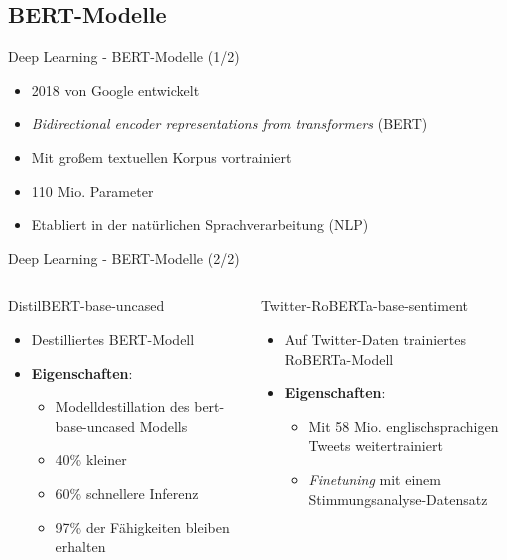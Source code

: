 \documentclass[aspectratio=169]{beamer}
\begin{document}
\subsection{BERT-Modelle}

\begin{frame}{Deep Learning - BERT-Modelle (1/2)}
	\begin{itemize}
		\item 2018 von Google entwickelt
		\item \textit{Bidirectional encoder representations from transformers} (BERT)
		\item Mit großem textuellen Korpus vortrainiert
		\item 110 Mio. Parameter
		\item Etabliert in der natürlichen Sprachverarbeitung (NLP)
	\end{itemize}
\end{frame}

\begin{frame}{Deep Learning - BERT-Modelle (2/2)}
	\begin{columns}[T]
		\begin{block}{DistilBERT-base-uncased}
			\begin{itemize}
				\item Destilliertes BERT-Modell
				\item \textbf{Eigenschaften}:
				      \begin{itemize}
					      \item Modelldestillation des bert-base-uncased Modells
					      \item 40\% kleiner
					      \item 60\% schnellere Inferenz
					      \item 97\% der Fähigkeiten bleiben erhalten
				      \end{itemize}
			\end{itemize}
			\vspace{0.04cm}
		\end{block}
		\begin{block}{Twitter-RoBERTa-base-sentiment}
			\begin{itemize}
				\item Auf Twitter-Daten trainiertes RoBERTa-Modell
				\item \textbf{Eigenschaften}:
				      \begin{itemize}
					      \item Mit 58 Mio. englischsprachigen Tweets weitertrainiert
					      \item \textit{Finetuning} mit einem Stimmungsanalyse-Datensatz
				      \end{itemize}
			\end{itemize}
			\vfill
		\end{block}
	\end{columns}
\end{frame}
\end{document}
